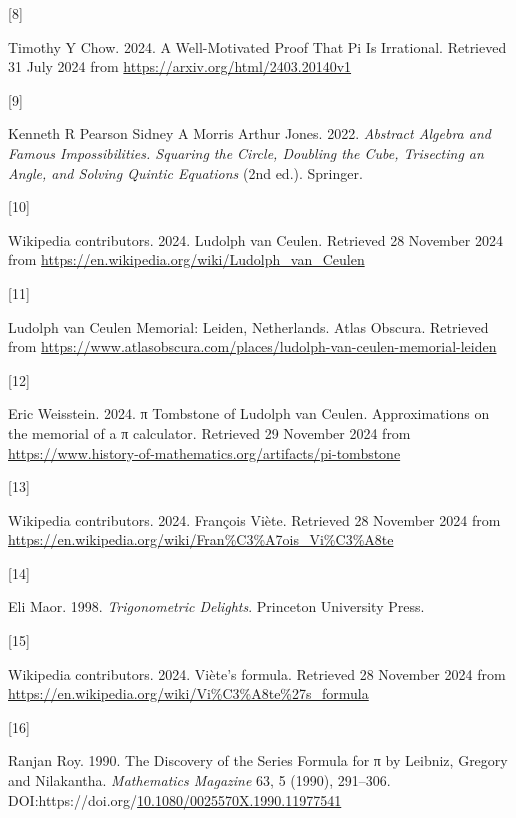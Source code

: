 \documentclass[
  a4paper,
]{article}
\newlength{\cslhangindent}
\newlength{\csllabelwidth}
\newenvironment{CSLReferences}[2] %
 {\begin{list}{}{%
  \setlength{\itemindent}{0pt}
  \setlength{\leftmargin}{0pt}
  \setlength{\parsep}{0pt}
  \ifodd #1
   \setlength{\leftmargin}{\cslhangindent}
   \setlength{\itemindent}{-1\cslhangindent}
  \fi
  \setlength{\itemsep}{#2\baselineskip}}}
 {\end{list}}
\newcommand{\CSLLeftMargin}[1]{\parbox[t]{\csllabelwidth}{\strut#1\strut}}
\newcommand{\CSLRightInline}[1]{\parbox[t]{\linewidth - \csllabelwidth}{\strut#1\strut}}
\begin{document}
\begin{CSLReferences}{0}{0}
\CSLLeftMargin{{[}8{]} }%
\CSLRightInline{Timothy Y Chow. 2024. {A Well-Motivated Proof That Pi Is
Irrational}. Retrieved 31 July 2024 from
\url{https://arxiv.org/html/2403.20140v1}}

\CSLLeftMargin{{[}9{]} }%
\CSLRightInline{Kenneth R Pearson Sidney A Morris Arthur Jones. 2022.
\emph{{Abstract Algebra and Famous Impossibilities}. {Squaring the
Circle, Doubling the Cube, Trisecting an Angle, and Solving Quintic
Equations}} (2nd ed.). Springer.}

\CSLLeftMargin{{[}10{]} }%
\CSLRightInline{Wikipedia contributors. 2024. {Ludolph van Ceulen}.
Retrieved 28 November 2024 from
\url{https://en.wikipedia.org/wiki/Ludolph_van_Ceulen}}

\CSLLeftMargin{{[}11{]} }%
\CSLRightInline{{Ludolph van Ceulen Memorial: Leiden, Netherlands}.
{Atlas Obscura}. Retrieved from
\url{https://www.atlasobscura.com/places/ludolph-van-ceulen-memorial-leiden}}

\CSLLeftMargin{{[}12{]} }%
\CSLRightInline{Eric Weisstein. 2024. {π Tombstone of Ludolph van
Ceulen}. {Approximations on the memorial of a π calculator}. Retrieved
29 November 2024 from
\url{https://www.history-of-mathematics.org/artifacts/pi-tombstone}}

\CSLLeftMargin{{[}13{]} }%
\CSLRightInline{Wikipedia contributors. 2024. {François Viète}.
Retrieved 28 November 2024 from
\url{https://en.wikipedia.org/wiki/Fran\%C3\%A7ois_Vi\%C3\%A8te}}

\CSLLeftMargin{{[}14{]} }%
\CSLRightInline{Eli Maor. 1998. \emph{{Trigonometric Delights}}.
Princeton University Press.}

\CSLLeftMargin{{[}15{]} }%
\CSLRightInline{Wikipedia contributors. 2024. {Viète's formula}.
Retrieved 28 November 2024 from
\url{https://en.wikipedia.org/wiki/Vi\%C3\%A8te\%27s_formula}}

\CSLLeftMargin{{[}16{]} }%
\CSLRightInline{Ranjan Roy. 1990. {The Discovery of the Series Formula
for π by Leibniz, Gregory and Nilakantha}. \emph{{Mathematics Magazine}}
63, 5 (1990), 291--306.
DOI:https://doi.org/\href{https://doi.org/10.1080/0025570X.1990.11977541}{10.1080/0025570X.1990.11977541}}


\end{CSLReferences}
\end{document}
